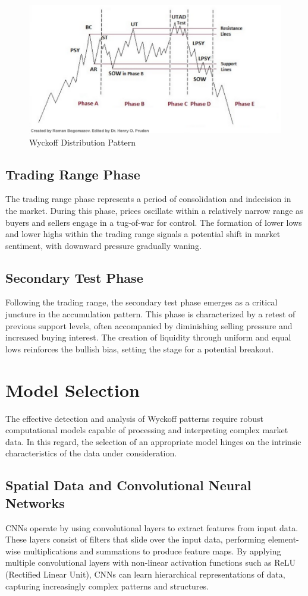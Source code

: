 \documentclass{article}
\begin{document}
\begin{figure}[ht]
	\centering
	\includegraphics[width=0.7\linewidth]{visuals/dist_visual}
	\caption{Wyckoff Distribution Pattern}
	\label{fig:distvisual}
\end{figure}


\subsection{Trading Range Phase}
The trading range phase represents a period of consolidation and indecision in the market. During this phase, prices oscillate within a relatively narrow range as buyers and sellers engage in a tug-of-war for control. The formation of lower lows and lower highs within the trading range signals a potential shift in market sentiment, with downward pressure gradually waning.



\subsection{Secondary Test Phase}
Following the trading range, the secondary test phase emerges as a critical juncture in the accumulation pattern. This phase is characterized by a retest of previous support levels, often accompanied by diminishing selling pressure and increased buying interest. The creation of liquidity through uniform and equal lows reinforces the bullish bias, setting the stage for a potential breakout.



\section{Model Selection}
The effective detection and analysis of Wyckoff patterns require robust computational models capable of processing and interpreting complex market data. In this regard, the selection of an appropriate model hinges on the intrinsic characteristics of the data under consideration.
\subsection{Spatial Data and Convolutional Neural Networks}
CNNs operate by using convolutional layers to extract features from input data. These layers consist of filters that slide over the input data, performing element-wise multiplications and summations to produce feature maps. By applying multiple convolutional layers with non-linear activation functions such as ReLU (Rectified Linear Unit), CNNs can learn hierarchical representations of data, capturing increasingly complex patterns and structures.
\end{document}

